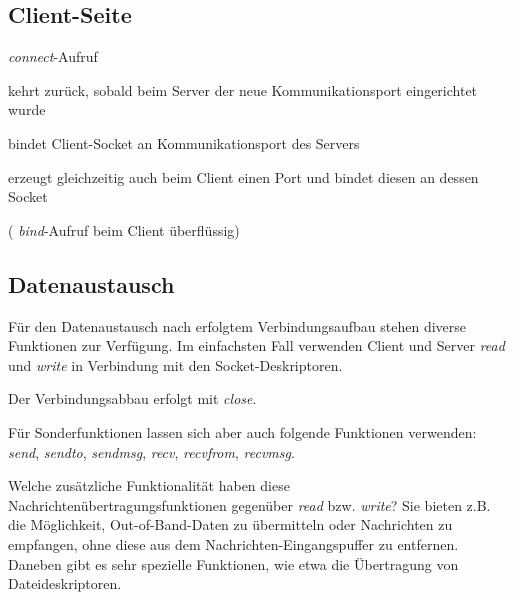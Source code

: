 \documentclass[12pt,utf8]{article}
\begin{document}
\subsection*{ Client-Seite}
{\em connect\/}-Aufruf 
\begin{titemize} 
\item kehrt zurück, sobald
beim Server der neue Kommunikationsport eingerichtet wurde
\item  bindet Client-Socket an Kommunikationsport des Servers 
\item  erzeugt gleichzeitig auch beim Client
einen Port und bindet diesen an dessen Socket

 ({\em
bind\/}-Aufruf beim Client überflüssig)
\end{titemize}

\subsection*{Datenaustausch}

Für den Datenaustausch nach erfolgtem Verbindungsaufbau stehen diverse
Funktionen zur Verfügung. Im einfachsten Fall verwenden Client und Server
{\em read\/} und {\em write\/} in Verbindung mit den Socket-Deskriptoren.

Der Verbindungsabbau erfolgt mit {\em close}.

Für Sonderfunktionen lassen sich aber auch folgende Funktionen verwenden:
{\em send\/}, {\em sendto\/}, {\em sendmsg\/}, {\em recv\/}, {\em recvfrom\/},
{\em recvmsg}.

Welche zusätzliche Funktionalität haben diese
Nachrichtenübertragungsfunktionen gegenüber {\em read\/} bzw. {\em
write}?  Sie bieten z.B. die Möglichkeit, Out-of-Band-Daten zu
übermitteln oder Nachrichten zu empfangen, ohne diese aus dem
Nachrichten-Eingangspuffer zu entfernen. Daneben gibt es sehr
spezielle Funktionen, wie etwa die Übertragung von Dateideskriptoren.
\end{document}
